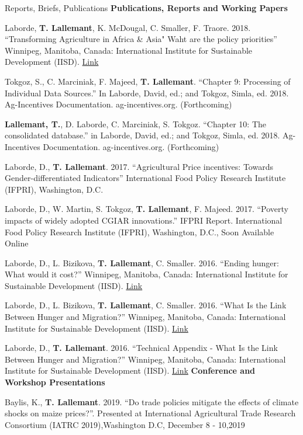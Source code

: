 \documentclass{resume} %
\begin{document}
\newpage
\begin{rSection}{Reports, Briefs, Publications} 
{\bf Publications, Reports and Working Papers}
\item Laborde, \textbf{T. Lallemant}, K. McDougal, C. Smaller, F. Traore. 2018. “Transforming Agriculture in Africa & Asia" Waht are the policy priorities” Winnipeg,
Manitoba, Canada: International Institute for Sustainable Development (IISD).
 \href{https://www.iisd.org/library/transforming-agriculture-africa-asia-what-are-policy-priorities} {Link}
\item Tokgoz, S., C. Marciniak, F. Majeed, \textbf{T. Lallemant}. “Chapter 9: Processing of Individual Data Sources.” In Laborde, David, ed.; and Tokgoz, Simla, ed. 2018. Ag-Incentives Documentation. ag-incentives.org.
(Forthcoming)
\item \textbf{Lallemant, T.}, D. Laborde, C. Marciniak, S. Tokgoz. “Chapter 10: The consolidated database.” in Laborde,
David, ed.; and Tokgoz, Simla, ed. 2018. Ag-Incentives Documentation. ag-incentives.org. (Forthcoming)
\item Laborde, D., \textbf{T. Lallemant}. 2017. “Agricultural Price incentives: Towards Gender-differentiated Indicators”
International Food Policy Research Institute (IFPRI), Washington, D.C.
\item Laborde, D., W. Martin, S. Tokgoz, \textbf{T. Lallemant}, F. Majeed. 2017. “Poverty impacts of widely adopted
CGIAR innovations.” IFPRI Report. International Food Policy Research Institute (IFPRI), Washington, D.C.,
Soon Available Online
\item Laborde, D., L. Bizikova, \textbf{T. Lallemant}, C. Smaller. 2016. “Ending hunger: What would it cost?” Winnipeg,
Manitoba, Canada: International Institute for Sustainable Development (IISD).
 \href{http://www.iisd.org/sites/default/files/publications/ending-hunger-what-would-it-cost.pdf} {Link}
\item Laborde, D., L. Bizikova, \textbf{T. Lallemant}, C. Smaller. 2016. “What Is the Link Between Hunger and Migration?”
Winnipeg, Manitoba, Canada: International Institute for Sustainable Development (IISD).
 \href{http://www.iisd.org/library/what-link-between-hunger-and-migration} {Link}
\item Laborde, D., \textbf{T. Lallemant}. 2016. “Technical Appendix - What Is the Link Between Hunger and Migration?”
Winnipeg, Manitoba, Canada: International Institute for Sustainable Development (IISD).
 \href{https://www.iisd.org/sites/default/files/uploads/link-between-hunger-migration-technical-appendix.pdf} {Link}
\vskip 0.02in
{\bf Conference and Workshop Presentations}
\item Baylis, K., \textbf{T. Lallemant}. 2019. “Do trade policies mitigate the effects of climate shocks on maize prices?”. Presented at International Agricultural Trade Research Consortium (IATRC 2019),Washington D.C, December 8 - 10,2019


\end{rSection}
\end{document}
